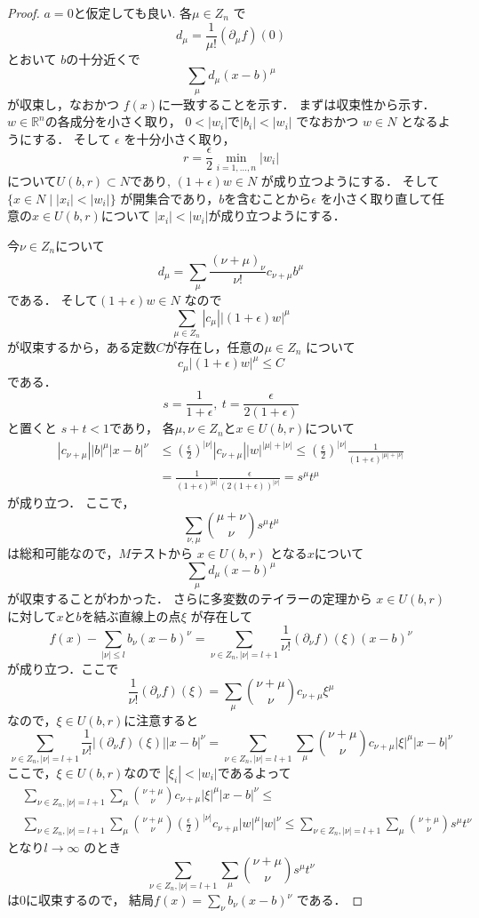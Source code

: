 \documentclass[leqno, a4paper, 12pt]{jsarticle}
\newcommand{\rr}{\mathbb{R}}
\begin{document}
\begin{proof}
$a=0$と仮定しても良い.
各$\mu\in Z_n$
で
\[
d_{\mu}=\frac{1}{\mu!}(\partial_{\mu}f)(0)
\]
とおいて
$b$の十分近くで
\[
\sum_{\mu}d_{\mu}(x-b)^{\mu}
\]
が収束し，なおかつ
$f(x)$に一致することを示す．
まずは収束性から示す．
$w\in \rr^n$の各成分を小さく取り，
$0<|w_i|$で$|b_i|<|w_i|$
でなおかつ
$w\in N$
となるようにする．
そして
$\epsilon$
を十分小さく取り，
\[
r=\frac{\epsilon}{2}\min_{i=1, \dots, n}|w_{i}|
\]
について$U(b, r)\subset N$であり,
$(1+\epsilon)w\in N$
が成り立つようにする．
そして$\{x\in N\mid |x_i|<|w_i|\}$
が開集合であり，$b$を含むことから$\epsilon$
を小さく取り直して任意の$x\in U(b, r)$について
$|x_i|<|w_i|$が成り立つようにする．

今$\nu\in Z_n$について
\[
d_{\mu}=\sum_{\mu}\frac{(\nu+\mu)_{\nu}}{\nu!}
c_{\nu+\mu}b^{\mu}
\]
である．
そして$(1+\epsilon)w\in N$
なので
\[
\sum_{\mu\in Z_n}|c_{\mu}||(1+\epsilon)w|^{\mu}
\]
が収束するから，ある定数$C$が存在し，任意の$\mu\in Z_n$
について
\[
c_{\mu}|(1+\epsilon)w|^{\mu}\le C
\]
である．
\[
s=\frac{1}{1+\epsilon}, \ t=\frac{\epsilon}{2(1+\epsilon)}
\]
と置くと
$s+t<1$であり，
各$\mu, \nu\in Z_n$と$x\in U(b, r)$について
\begin{align*}
|c_{\nu+\mu}||b|^{\mu}|x-b|^{\nu}&\le 
\left(\frac{\epsilon}{2}\right)^{|\nu|}|c_{\nu+\mu}||w|^{|\mu|+|\nu|}
\le
\left(\frac{\epsilon}{2}\right)^{|\nu|}\frac{1}{(1+\epsilon)^{|\mu|+|\nu|}}
\\
&= 
\frac{1}{(1+\epsilon)^{|\mu|}}\frac{\epsilon}{(2(1+\epsilon))^{|\nu|}}
=s^{\mu}t^{\mu}
\end{align*}
が成り立つ．
ここで，
\[
\sum_{\nu, \mu}\binom{\mu+\nu}{\nu}s^{\mu}t^{\mu}
\]
は総和可能なので，$M$テストから
$x\in U(b, r)$
となる$x$について
\[
\sum_{\mu}d_{\mu}(x-b)^{\mu}
\]
が収束することがわかった．
さらに多変数のテイラーの定理から
$x\in U(b,r)$に対して$x$と$b$を結ぶ直線上の点$\xi$
が存在して
\[
f(x)-\sum_{|\nu|\le l}b_{\nu}(x-b)^{\nu}=
\sum_{\nu\in Z_n, |\nu|=l+1}\frac{1}{\nu!}(\partial_{\nu}f)(\xi)(x-b)^{\nu}
\]
が成り立つ．ここで
\[
\frac{1}{\nu!}(\partial_{\nu}f)(\xi)=
\sum_{\mu}\binom{\nu+\mu}{\nu}
c_{\nu+\mu}\xi^{\mu}
\]
なので，$\xi\in U(b, r)$に注意すると
\[
\sum_{\nu\in Z_n, |\nu|=l+1}\frac{1}{\nu!}|(\partial_{\nu}f)(\xi)||x-b|^{\nu}
=\sum_{\nu\in Z_n, |\nu|=l+1}\sum_{\mu}\binom{\nu+\mu}{\nu}
c_{\nu+\mu}|\xi|^{\mu}|x-b|^{\nu}
\]
ここで，$\xi\in U(b, r)$なので
$|\xi_i|<|w_i|$であるよって
\begin{align*}
&\sum_{\nu\in Z_n, |\nu|=l+1}\sum_{\mu}\binom{\nu+\mu}{\nu}
c_{\nu+\mu}|\xi|^{\mu}|x-b|^{\nu}
\le\\ 
&\sum_{\nu\in Z_n, |\nu|=l+1}\sum_{\mu}\binom{\nu+\mu}{\nu}
\left(\frac{\epsilon}{2}\right)^{|\nu|}c_{\nu+\mu}|w|^{\mu}|w|^{\nu}
\le 
\sum_{\nu\in Z_n, |\nu|=l+1}\sum_{\mu}\binom{\nu+\mu}{\nu}
s^{\mu}t^{\nu}
\end{align*}
となり$l\to \infty$
のとき
\[
\sum_{\nu\in Z_n, |\nu|=l+1}\sum_{\mu}\binom{\nu+\mu}{\nu}
s^{\mu}t^{\nu}
\]
は$0$に収束するので，
結局$f(x)=\sum_{\nu}b_{\nu}(x-b)^{\nu}$
である．
\end{proof}
\end{document}
